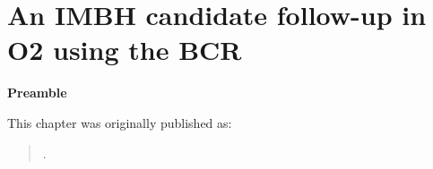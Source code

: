 \chapter[IMBH Search]{An IMBH candidate follow-up in O2 using the BCR}
\label{ch.bcr}


\textbf{Preamble}

This chapter was originally published as:

\begin{quote}
.
\end{quote}



